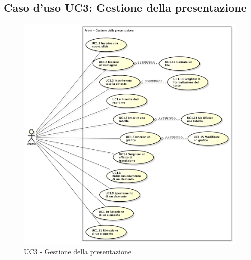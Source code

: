 \subsection{Caso d'uso UC3: Gestione della presentazione}
\begin{figure}[h] 
	\centering 
	\includegraphics[scale=0.45] {img/UC3.png} 
	\caption{UC3 - Gestione della presentazione} 
\end{figure}

